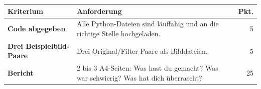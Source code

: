 \begin{center}
\begin{tabularx}{\textwidth}{>{\bfseries}p{4cm} X r}
\toprule
\tableheadercolor
Kriterium & Anforderung & Pkt. \\
\midrule
Code abgegeben
  & Alle Python-Dateien sind l\"auffahig und an die richtige Stelle hochgeladen.
  & 5 \\
\midrule
Drei Beispielbild-Paare
  & Drei Original/Filter-Paare als Bilddateien.
  & 5 \\
\midrule
Bericht
  & 2 bis 3 A4-Seiten: Was hast du gemacht? Was war schwierig?
    Was hat dich \"uberrascht?
  & 25 \\
\bottomrule
\end{tabularx}
\end{center}

\closechapter
